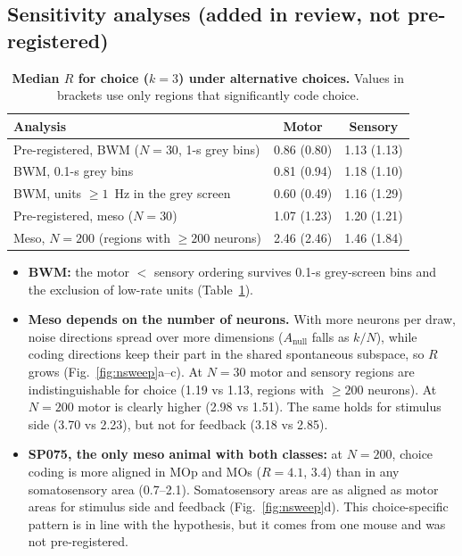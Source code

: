 \documentclass[10pt]{article}
\begin{document}
\subsection{Sensitivity analyses (added in review, not pre-registered)}

\begin{table}[h]
\centering\small
\caption{\textbf{Median $R$ for choice ($k=3$) under alternative choices.} Values in brackets use only regions that significantly code choice.}
\label{tab:sens}
\begin{tabular}{lcc}
\toprule
Analysis & Motor & Sensory \\
\midrule
Pre-registered, BWM ($N=30$, 1-s grey bins) & 0.86 (0.80) & 1.13 (1.13) \\
BWM, 0.1-s grey bins & 0.81 (0.94) & 1.18 (1.10) \\
BWM, units $\ge 1$~Hz in the grey screen & 0.60 (0.49) & 1.16 (1.29) \\
Pre-registered, meso ($N=30$) & 1.07 (1.23) & 1.20 (1.21) \\
Meso, $N=200$ (regions with $\ge 200$ neurons) & 2.46 (2.46) & 1.46 (1.84) \\
\bottomrule
\end{tabular}
\end{table}

\begin{itemize}
  \item \textbf{BWM:} the motor $<$ sensory ordering survives 0.1-s grey-screen bins and the exclusion of low-rate units (Table~\ref{tab:sens}).
  \item \textbf{Meso depends on the number of neurons.} With more neurons per draw, noise directions spread over more dimensions ($A_\text{null}$ falls as $k/N$), while coding directions keep their part in the shared spontaneous subspace, so $R$ grows (Fig.~\ref{fig:nsweep}a--c). At $N=30$ motor and sensory regions are indistinguishable for choice (1.19 vs 1.13, regions with $\ge 200$ neurons). At $N=200$ motor is clearly higher (2.98 vs 1.51). The same holds for stimulus side (3.70 vs 2.23), but not for feedback (3.18 vs 2.85).
  \item \textbf{SP075, the only meso animal with both classes:} at $N=200$, choice coding is more aligned in MOp and MOs ($R=4.1$, 3.4) than in any somatosensory area (0.7--2.1). Somatosensory areas are as aligned as motor areas for stimulus side and feedback (Fig.~\ref{fig:nsweep}d). This choice-specific pattern is in line with the hypothesis, but it comes from one mouse and was not pre-registered.
\end{itemize}
\end{document}
